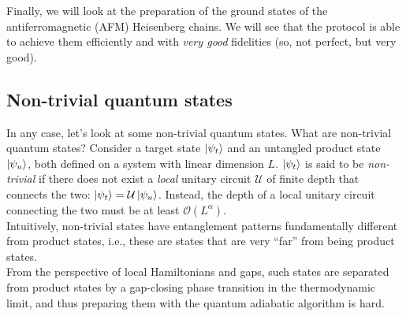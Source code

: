 \documentclass{book}
\theoremstyle{definition}
\newcommand{\al}{\alpha}
\newcommand{\U}{\mathcal{U}}
\begin{document}
Finally, we will look at the preparation of the ground states of the antiferromagnetic (AFM) Heisenberg chains. We will see that the protocol is able to achieve them efficiently and with \textit{very good} fidelities (so, not perfect, but very good).



\subsection{Non-trivial quantum states}


In any case, let's look at some non-trivial quantum states. What are non-trivial quantum states? Consider a target state $\ket{\psi_t}$ and an untangled product state $\ket{\psi_u}$, both defined on a system with linear dimension $L$. $\ket{\psi_t}$ is said to be \textit{non-trivial} if there does not exist a \textit{local} unitary circuit $\U$ of finite depth that connects the two: $\ket{\psi_t} = \U \ket{\psi_u}$. Instead, the depth of a local unitary circuit connecting the two must be at least $\mathcal{O}(L^\al)$. \\

Intuitively, non-trivial states have entanglement patterns fundamentally different from product states, i.e., these are states that are very ``far'' from being product states. \\

From the perspective of local Hamiltonians and gaps, such states are separated from product states by a gap-closing phase transition in the thermodynamic limit, and thus preparing them with the quantum adiabatic algorithm is hard.\\
\end{document}

